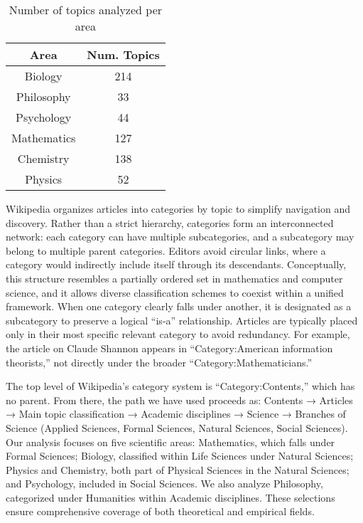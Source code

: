 \begin{table}
\begin{centering}
\begin{tabular}{|c|c|}
\hline 
Area & Num. Topics \tabularnewline
\hline 
\hline
Biology & 214 \tabularnewline
\hline
Philosophy & 33 \tabularnewline
\hline
Psychology & 44 \tabularnewline
\hline
Mathematics & 127 \tabularnewline
\hline
Chemistry & 138 \tabularnewline
\hline
Physics & 52 \tabularnewline
\hline
\end{tabular}
\par\end{centering}
\caption{\label{tab:num_topics_per_area}Number of topics analyzed per area}
\end{table}

Wikipedia organizes articles into categories by topic to simplify navigation and discovery. Rather than a strict hierarchy, categories form an interconnected network: each category can have multiple subcategories, and a subcategory may belong to multiple parent categories. Editors avoid circular links, where a category would indirectly include itself through its descendants. Conceptually, this structure resembles a partially ordered set in mathematics and computer science, and it allows diverse classification schemes to coexist within a unified framework. When one category clearly falls under another, it is designated as a subcategory to preserve a logical “is‑a” relationship. Articles are typically placed only in their most specific relevant category to avoid redundancy. For example, the article on Claude Shannon appears in “Category:American information theorists,” not directly under the broader “Category:Mathematicians.”

The top level of Wikipedia’s category system is “Category:Contents,” which has no parent. From there, the path we have used proceeds as: Contents → Articles → Main topic classification → Academic disciplines → Science → Branches of Science (Applied Sciences, Formal Sciences, Natural Sciences, Social Sciences). Our analysis focuses on five scientific areas: Mathematics, which falls under Formal Sciences; Biology, classified within Life Sciences under Natural Sciences; Physics and Chemistry, both part of Physical Sciences in the Natural Sciences; and Psychology, included in Social Sciences. We also analyze Philosophy, categorized under Humanities within Academic disciplines. These selections ensure comprehensive coverage of both theoretical and empirical fields.

